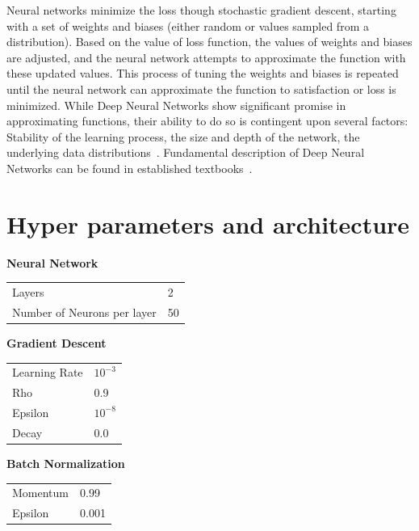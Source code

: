 Neural networks minimize the loss though stochastic gradient descent, starting with a set of weights and biases (either random or values sampled from a distribution).
Based on the value of loss function, the values of weights and biases are adjusted, and the neural network attempts to approximate the function with these updated values.
This process of tuning the weights and biases is repeated until the neural network can approximate the function to satisfaction or loss is minimized.
While Deep Neural Networks show significant promise in approximating functions, their ability to do so is contingent upon several factors: Stability of the learning process, the size and depth of the network, the underlying data distributions~\cite{goodfellow2016Deep,chollet2017Deep}.
Fundamental description of Deep Neural Networks can be found in established textbooks~\cite{goodfellow2016Deep}.

\section{Hyper parameters and architecture}\label{SI:hyperparams}

\noindent\textbf{Neural Network}
\begin{table}[H]
\begin{tabular}{ll}
\toprule
Layers                      & 2  \\
Number of Neurons per layer & 50 \\
\bottomrule
\end{tabular}
\end{table}

\noindent\textbf{Gradient Descent}
\begin{table}[H]
\begin{tabular}{ll}
\toprule
Learning Rate                      & $10^{-3}$  \\
Rho & 0.9 \\
Epsilon & $10^{-8}$ \\
Decay & 0.0\\
\bottomrule
\end{tabular}
\end{table}

\noindent\textbf{Batch Normalization}
\begin{table}[H]
\begin{tabular}{ll}
\toprule
Momentum                     & 0.99  \\
Epsilon & 0.001 \\
\bottomrule
\end{tabular}
\end{table}

